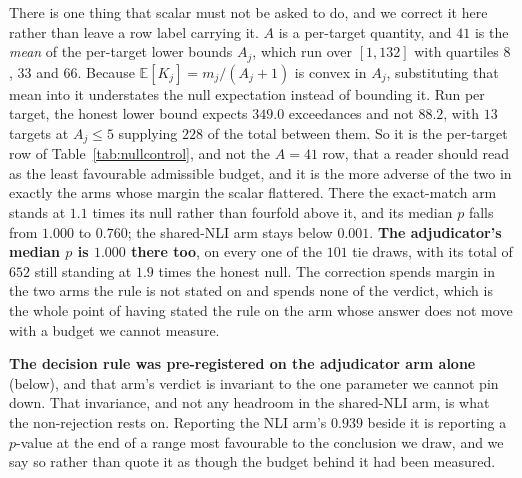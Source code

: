 There is one thing that scalar must not be asked to do, and we correct it here rather than
leave a row label carrying it. $A$ is a per-target quantity, and $41$ is the \emph{mean} of
the per-target lower bounds $A_j$, which run over $[1,132]$ with quartiles $8$, $33$ and
$66$. Because $\mathbb{E}[K_j] = m_j/(A_j{+}1)$ is convex in $A_j$, substituting that mean
into it understates the null expectation instead of bounding it. Run per target, the honest
lower bound expects $349.0$ exceedances and not $88.2$, with $13$ targets at $A_j{\leq}5$
supplying $228$ of the total between them. So it is the per-target row of
Table~\ref{tab:nullcontrol}, and not the $A{=}41$ row, that a reader should read as the least
favourable admissible budget, and it is the more adverse of the two in exactly the arms whose
margin the scalar flattered. There the exact-match arm stands at $1.1$ times its null rather
than fourfold above it, and its median $p$ falls from $1.000$ to $0.760$; the shared-NLI arm
stays below $0.001$. \textbf{The adjudicator's median $p$ is $1.000$ there too}, on every one
of the $101$ tie draws, with its total of $652$ still standing at $1.9$ times the honest
null. The correction spends margin in the two arms the rule is not stated on and spends none
of the verdict, which is the whole point of having stated the rule on the arm whose answer
does not move with a budget we cannot measure.

\textbf{The decision rule was pre-registered on the adjudicator arm alone} (below), and that
arm's verdict is invariant to the one parameter we cannot pin down. That invariance, and not
any headroom in the shared-NLI arm, is what the non-rejection rests on. Reporting the NLI
arm's $0.939$ beside it is reporting a $p$-value at the end of a range most favourable to the
conclusion we draw, and we say so rather than quote it as though the budget behind it had
been measured.

